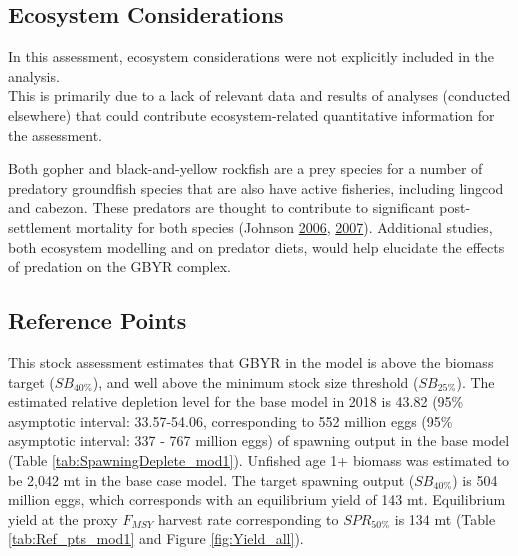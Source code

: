 \documentclass[12pt,]{article}
\begin{document}
\FloatBarrier

\subsection*{Ecosystem Considerations}\label{ecosystem-considerations}

In this assessment, ecosystem considerations were not explicitly
included in the analysis.\\
This is primarily due to a lack of relevant data and results of analyses
(conducted elsewhere) that could contribute ecosystem-related
quantitative information for the assessment.

Both gopher and black-and-yellow rockfish are a prey species for a
number of predatory groundfish species that are also have active
fisheries, including lingcod and cabezon. These predators are thought to
contribute to significant post-settlement mortality for both species
(Johnson \protect\hyperlink{ref-Johnson2006}{2006},
\protect\hyperlink{ref-Johnson2007}{2007}). Additional studies, both
ecosystem modelling and on predator diets, would help elucidate the
effects of predation on the GBYR complex.

\subsection*{Reference Points}\label{reference-points}

This stock assessment estimates that GBYR in the model is above the
biomass target (\(SB_{40\%}\)), and well above the minimum stock size
threshold (\(SB_{25\%}\)). The estimated relative depletion level for
the base model in 2018 is 43.82 (95\% asymptotic interval: 33.57-54.06,
corresponding to 552 million eggs (95\% asymptotic interval: 337 - 767
million eggs) of spawning output in the base model (Table
\ref{tab:SpawningDeplete_mod1}). Unfished age 1+ biomass was estimated
to be 2,042 mt in the base case model. The target spawning output
(\(SB_{40\%}\)) is 504 million eggs, which corresponds with an
equilibrium yield of 143 mt. Equilibrium yield at the proxy \(F_{MSY}\)
harvest rate corresponding to \(SPR_{50\%}\) is 134 mt (Table
\ref{tab:Ref_pts_mod1} and Figure \ref{fig:Yield_all}).

\FloatBarrier
\end{document}
